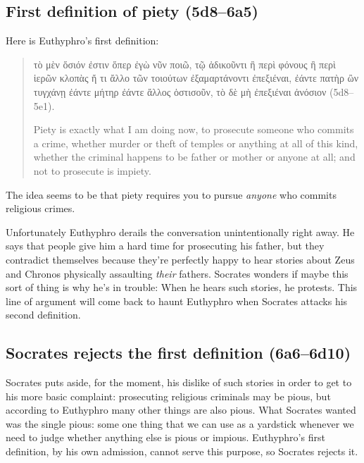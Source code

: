 \documentclass[11pt]{article}
\begin{document}
\subsection{First definition of piety (5d8--6a5)}

Here is Euthyphro's first definition:

\begin{quote}
    τὸ μὲν ὅσιόν ἐστιν ὅπερ ἐγὼ νῦν ποιῶ, τῷ ἀδικοῦντι ἢ περὶ φόνους ἢ περὶ
    ἱερῶν κλοπὰς ἤ τι ἄλλο τῶν τοιούτων ἐξαμαρτάνοντι ἐπεξιέναι, ἐάντε
    πατὴρ ὢν τυγχάνῃ ἐάντε μήτηρ ἐάντε ἄλλος ὁστισοῦν, τὸ δὲ μὴ ἐπεξιέναι
    ἀνόσιον (5d8--5e1).

    Piety is exactly what I am doing now, to prosecute someone who commits
    a crime, whether murder or theft of temples or anything at all of this
    kind, whether the criminal happens to be father or mother or anyone at
    all; and not to prosecute is impiety.
\end{quote}

The idea seems to be that piety requires you to pursue \emph{anyone} who
commits religious crimes.

Unfortunately Euthyphro derails the conversation unintentionally right
away.  He says that people give him a hard time for prosecuting his father,
but they contradict themselves because they're perfectly happy to hear
stories about Zeus and Chronos physically assaulting \emph{their} fathers.
Socrates wonders if maybe this sort of thing is why he's in trouble: When
he hears such stories, he protests.  This line of argument will come back
to haunt Euthyphro when Socrates attacks his second definition.

\subsection{Socrates rejects the first definition (6a6--6d10)}

Socrates puts aside, for the moment, his dislike of such stories in order
to get to his more basic complaint: prosecuting religious criminals may be
pious, but according to Euthyphro many other things are also pious.  What
Socrates wanted was the single pious: some one thing that we can use as
a yardstick whenever we need to judge whether anything else is pious or
impious.  Euthyphro's first definition, by his own admission, cannot serve
this purpose, so Socrates rejects it.
\end{document}
